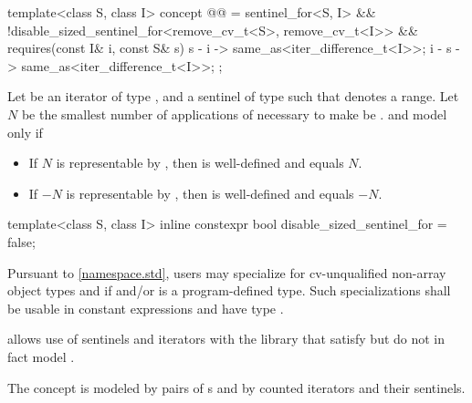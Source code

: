 \begin{itemdecl}
template<class S, class I>
  concept @@ =
    sentinel_for<S, I> &&
    !disable_sized_sentinel_for<remove_cv_t<S>, remove_cv_t<I>> &&
    requires(const I& i, const S& s) {
      { s - i } -> same_as<iter_difference_t<I>>;
      { i - s } -> same_as<iter_difference_t<I>>;
    };
\end{itemdecl}

\begin{itemdescr}
\pnum
Let  be an iterator of type , and 
a sentinel of type  such that  denotes a range.
Let $N$ be the smallest number of applications of 
necessary to make  be .
 and  model  only if
\begin{itemize}
\item If $N$ is representable by ,
      then  is well-defined and equals $N$.

\item If $-N$ is representable by ,
      then  is well-defined and equals $-N$.
\end{itemize}
\end{itemdescr}

%
\begin{itemdecl}
template<class S, class I>
  inline constexpr bool disable_sized_sentinel_for = false;
\end{itemdecl}

\begin{itemdescr}
\pnum
\remarks
Pursuant to \ref{namespace.std},
users may specialize 
for cv-unqualified non-array object types  and 
if  and/or  is a program-defined type.
Such specializations shall
be usable in constant expressions and
have type .

\pnum
\begin{note}
 allows use of sentinels and iterators with
the library that satisfy but do not in fact model .
\end{note}

\pnum
\begin{example}
The  concept is modeled by pairs of
s and by
counted iterators and their sentinels.
\end{example}
\end{itemdescr}


